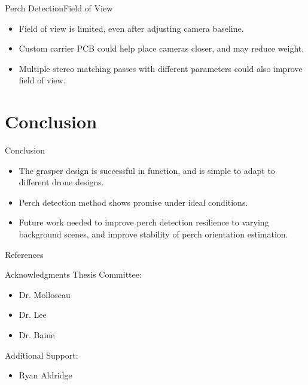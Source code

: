 \documentclass{beamer}
\begin{document}
\begin{frame}{Perch Detection}{Field of View}
    \begin{itemize}
        \item Field of view is limited, even after adjusting camera baseline.
        \item Custom carrier PCB could help place cameras closer, and may reduce weight.
        \item Multiple stereo matching passes with different parameters could also improve field of view.
    \end{itemize}

\end{frame}

\section{Conclusion}

\begin{frame}{Conclusion}
    \begin{itemize}
        \item The grasper design is successful in function, and is simple to adapt to different drone designs.
        \item Perch detection method shows promise under ideal conditions.
        \item Future work needed to improve perch detection resilience to varying background scenes, and improve 
            stability of perch orientation estimation.
    \end{itemize}
\end{frame}

\begin{frame}[allowframebreaks]{References}
    \renewcommand*{\bibfont}{\tiny}
    \printbibliography[heading=none]
\end{frame}

\begin{frame}{Acknowledgments}
    Thesis Committee:
    \begin{itemize}
        \item Dr. Molloseau
        \item Dr. Lee
        \item Dr. Baine
    \end{itemize}
    Additional Support:
    \begin{itemize}
        \item Ryan Aldridge
    \end{itemize}
\end{frame}
\end{document}

